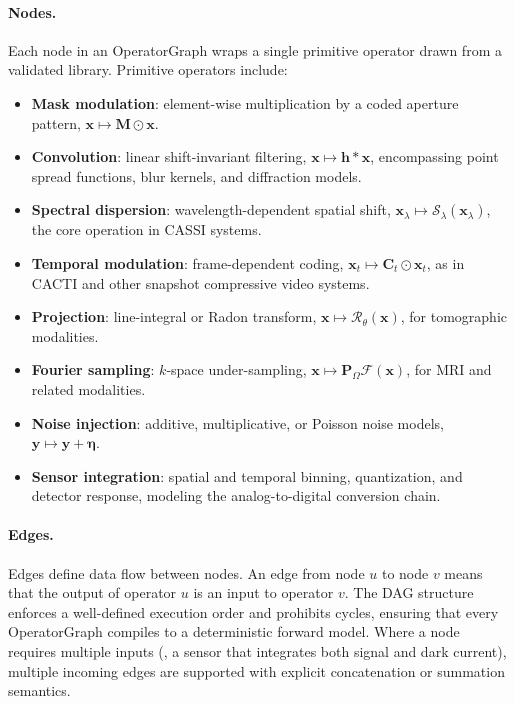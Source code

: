 \paragraph{Nodes.}
Each node in an OperatorGraph wraps a single primitive operator drawn
from a validated library.
Primitive operators include:
\begin{itemize}
  \item \textbf{Mask modulation}: element-wise multiplication by a
        coded aperture pattern, $\mathbf{x} \mapsto \mathbf{M} \odot
        \mathbf{x}$.
  \item \textbf{Convolution}: linear shift-invariant filtering,
        $\mathbf{x} \mapsto \mathbf{h} \ast \mathbf{x}$, encompassing
        point spread functions, blur kernels, and diffraction models.
  \item \textbf{Spectral dispersion}: wavelength-dependent spatial
        shift, $\mathbf{x}_\lambda \mapsto \mathcal{S}_\lambda
        (\mathbf{x}_\lambda)$, the core operation in CASSI systems.
  \item \textbf{Temporal modulation}: frame-dependent coding,
        $\mathbf{x}_t \mapsto \mathbf{C}_t \odot \mathbf{x}_t$,
        as in CACTI and other snapshot compressive video systems.
  \item \textbf{Projection}: line-integral or Radon transform,
        $\mathbf{x} \mapsto \mathcal{R}_\theta(\mathbf{x})$, for
        tomographic modalities.
  \item \textbf{Fourier sampling}: $k$-space under-sampling,
        $\mathbf{x} \mapsto \mathbf{P}_\Omega
        \mathcal{F}(\mathbf{x})$, for MRI and related modalities.
  \item \textbf{Noise injection}: additive, multiplicative, or
        Poisson noise models, $\mathbf{y} \mapsto \mathbf{y} +
        \boldsymbol{\eta}$.
  \item \textbf{Sensor integration}: spatial and temporal binning,
        quantization, and detector response, modeling the
        analog-to-digital conversion chain.
\end{itemize}

\paragraph{Edges.}
Edges define data flow between nodes.
An edge from node $u$ to node $v$ means that the output of operator $u$
is an input to operator $v$.
The DAG structure enforces a well-defined execution order and prohibits
cycles, ensuring that every OperatorGraph compiles to a deterministic
forward model.
Where a node requires multiple inputs (\eg, a sensor that integrates
both signal and dark current), multiple incoming edges are supported
with explicit concatenation or summation semantics.

